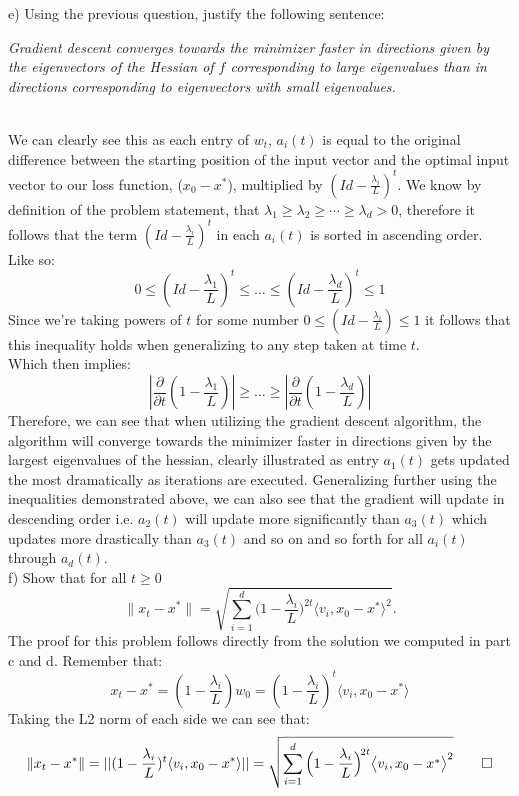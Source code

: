 \documentclass[12pt,twoside]{article}
\begin{document}
e) Using the previous question, justify the following sentence:
\begin{center}
\emph{
 Gradient descent converges towards the minimizer faster in directions given  by the eigenvectors of the Hessian of $f$ corresponding to large eigenvalues than in directions corresponding to eigenvectors with small eigenvalues.}
\end{center} \\
We can clearly see this as each entry of $w_t$, $a_i(t)$ is equal to the original difference between the starting position of the input vector and the optimal input vector to our loss function, ($x_0-x^*$), multiplied by $(Id-\frac{\lambda_i}{L})^t$. We know by definition of the problem statement, that 
$\lambda_1 \geq \lambda_2 \geq \cdots \geq \lambda_d >0$, therefore it follows that the term $(Id-\frac{\lambda_i}{L})^t$ in each $a_i(t)$ is sorted in ascending order. Like so:
$$
    0 \leq (Id-\frac{\lambda_1}{L})^t \leq \dots \leq (Id-\frac{\lambda_d}{L})^t \leq 1
$$
Since we're taking powers of $t$ for some number $0\leq (Id-\frac{\lambda_i}{L}) \leq 1 $ it follows that this inequality holds when generalizing to any step taken at time $t$. \\
Which then implies:
$$
    |\frac{\partial}{\partial t} (1-\frac{\lambda_1}{L})| \geq \dots \geq |\frac{\partial}{\partial t} (1-\frac{\lambda_d}{L})| 
$$  
Therefore, we can see that when utilizing the gradient descent algorithm, the algorithm will converge towards the minimizer faster in directions given by the largest eigenvalues of the hessian, clearly illustrated as entry $a_1(t)$ gets updated the most dramatically as iterations are executed. Generalizing further using the inequalities demonstrated above, we can also see that the gradient will update in descending order i.e. $a_2(t)$ will update more significantly than  $a_3(t)$ which updates more drastically than $a_3(t)$ and so on and so forth for all $a_i(t)$ through $a_d(t)$.\\ 


f) Show that for all $t \geq 0$
$$
\|x_t - x^* \| = \sqrt{\sum_{i=1}^d \Big(1-\frac{\lambda_i}{L}\Big)^{\!2t} \big\langle v_i, x_0-x^* \big\rangle^2}.
$$
The proof for this problem follows directly from the solution we computed in part c and d. Remember that:
$$
x_t - x^*  = (1-\frac{\lambda_i}{L})w_0 = (1-\frac{\lambda_i}{L})^t\langle v_i, x_0-x^* \rangle
$$
Taking the L2 norm of each side we can see that:
$$
\|x_t - x^* \| = ||(1-\frac{\lambda_i}{L})^t\langle v_i, x_0-x^* \rangle|| = \sqrt{\sum_{i=1}^d \Big(1-\frac{\lambda_i}{L}\Big)^{\!2t} \big\langle v_i, x_0-x^* \big\rangle^2} \qed
$$
\end{document}
